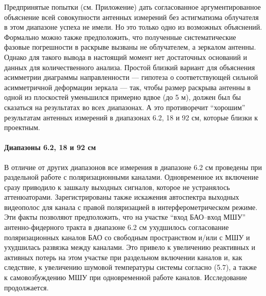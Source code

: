 Предпринятые попытки (см. Приложение) дать согласованное
аргументированное объяснение всей совокупности антенных измерений без
астигматизма облучателя в этом диапазоне успеха не имели.
Но это только одно из возможных объяснений.
Формально можно также предположить, что полученные систематические фазовые погрешности в раскрыве
вызваны не облучателем, а зеркалом антенны.
Однако для такого вывода в настоящий момент нет достаточных оснований
и данных для количественного анализа. Простой близкий вариант для объяснения асимметрии диаграммы
направленности --- гипотеза о соответствующей сильной асимметричной деформации зеркала --- так,
чтобы размер раскрыва антенны
в одной из плоскостей уменьшился примерно вдвое (до 5 м), должен был бы сказаться на результатах во
всех диапазонах. А это противоречит ``хорошим'' результатам антенных измерений в диапазонах 6.2, 18
и 92 см, которые близки к проектным.




\paragraph{Диапазоны 6.2, 18 и 92 см}

В отличие от других диапазонов все измерения в диапазоне 6.2 см проведены
при раздельной работе с поляризационными каналами.
Одновременное их включение сразу приводило к зашкалу выходных сигналов,
которое не устранялось аттенюаторами.
Зарегистрированы также искажения автоспектра выходных видеополос для
канала с правой поляризацией в интерферометрическом режиме. Эти
факты позволяют предположить, что на участке ``вход БАО--вход МШУ''
антенно-фидерного тракта в диапазоне 6.2 см ухудшилось согласование
поляризационных каналов БАО со свободным пространством и/или с МШУ и
ухудшилась развязка между каналами.
Это привело к увеличению реактивных и активных потерь на
этом участке при раздельном включении каналов и, как следствие, к
увеличению шумовой температуры системы согласно (5.7), а также к
самовозбуждению МШУ при одновременной работе каналов.
Исследование продолжается.


